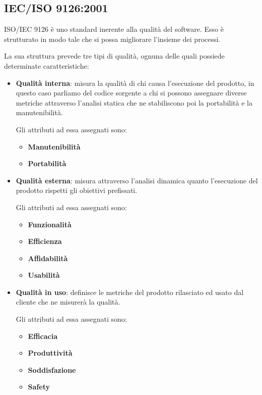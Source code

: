 	\subsection{IEC/ISO 9126:2001}
	ISO/IEC 9126 è uno standard inerente alla qualità del software. Esso è strutturato in modo tale che si possa migliorare l'insieme dei processi.
	
	La sua struttura prevede tre tipi di qualità, ognuna delle quali possiede determinate caratteristiche:
	
	\begin{itemize}
		\item \textbf{Qualità interna}: misura la qualità di chi causa l'esecuzione del prodotto, in questo caso parliamo del codice sorgente a chi si possono assegnare diverse metriche attraverso l'analisi statica che ne stabiliscono poi la portabilità e la manutenibilità.
		
		Gli attributi ad essa assegnati sono:
		
		\begin{itemize}
			\item \textbf{Manutenibilità}
			\item \textbf{Portabilità}
		\end{itemize}
	
		\item \textbf{Qualità esterna}: misura attraverso l'analisi dinamica quanto l'esecuzione del prodotto rispetti gli obiettivi prefissati.
		
		Gli attributi ad essa assegnati sono:
		
			\begin{itemize}
			\item \textbf{Funzionalità}
			\item \textbf{Efficienza}
			\item \textbf{Affidabilità}
			\item \textbf{Usabilità}
		\end{itemize}
	
		\item \textbf{Qualità in uso}: definisce le metriche del prodotto rilasciato ed usato dal cliente che ne misurerà la qualità.
		
		Gli attributi ad essa assegnati sono:
		
		\begin{itemize}
			\item \textbf{Efficacia}
			\item \textbf{Produttività}
			\item \textbf{Soddisfazione}
			\item \textbf{Safety}
		\end{itemize}
	\end{itemize}

